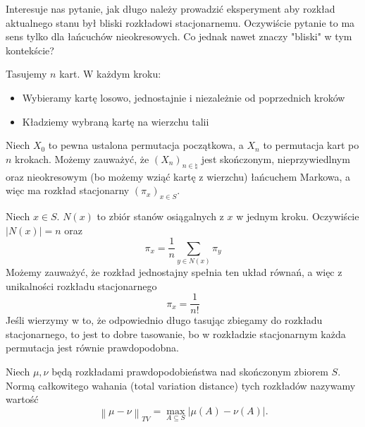 Interesuje nas pytanie, jak długo należy prowadzić eksperyment aby rozkład aktualnego stanu był bliski rozkładowi stacjonarnemu. Oczywiście pytanie to ma sens tylko dla łańcuchów nieokresowych. Co jednak nawet znaczy "bliski" w tym kontekście?

\begin{example}
	Tasujemy \(n\) kart. W każdym kroku:
	\begin{itemize}
		\item Wybieramy kartę losowo, jednostajnie i niezależnie od poprzednich kroków
		\item Kładziemy wybraną kartę na wierzchu talii
	\end{itemize}
	Niech \(X_0\) to pewna ustalona permutacja początkowa, a \(X_n\) to permutacja kart po \(n\) krokach. Możemy zauważyć, że \((X_n)_{n \in \natural}\) jest skończonym, nieprzywiedlnym oraz nieokresowym (bo możemy wziąć kartę z wierzchu) łańcuchem Markowa, a więc ma rozkład stacjonarny \((\pi_x)_{x \in S}\).

	Niech \(x \in S\). \(N(x)\) to zbiór stanów osiągalnych z \(x\) w jednym kroku. Oczywiście \(|N(x)| = n\) oraz
	\[
		\pi_x = \frac{1}{n} \sum_{y \in N(x)} \pi_y
	\]
	Możemy zauważyć, że rozkład jednostajny spełnia ten układ równań, a więc z unikalności rozkładu stacjonarnego
	\[
		\pi_x = \frac{1}{n!}
	\]
	Jeśli wierzymy w to, że odpowiednio długo tasując zbiegamy do rozkładu stacjonarnego, to jest to dobre tasowanie, bo w rozkładzie stacjonarnym każda permutacja jest równie prawdopodobna.
\end{example}


\begin{definition}
	Niech \(\mu, \nu\) będą rozkładami prawdopodobieństwa nad skończonym zbiorem \(S\). Normą całkowitego wahania (total variation distance) tych rozkładów nazywamy wartość
	\[ \left\|\mu-\nu\right\|_{TV} = \max_{A \subseteq S} \left|\mu\left( A  \right) - \nu\left( A \right) \right| .\]
\end{definition}

